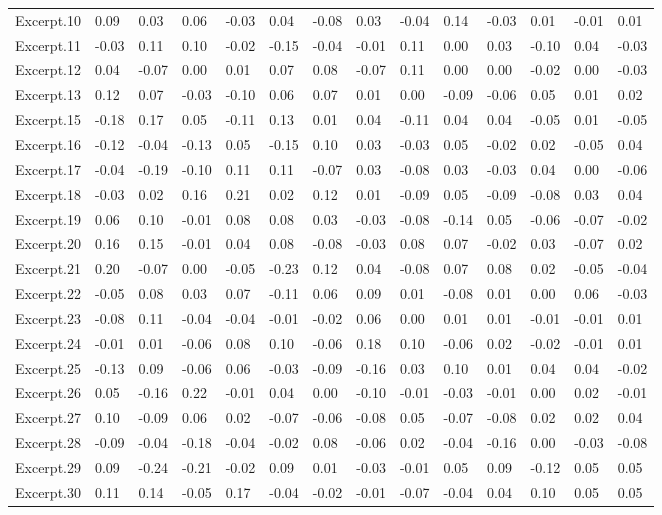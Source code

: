 \documentclass[
]{article}
\newenvironment{lltable}{\begin{landscape}\begin{center}\begin{ThreePartTable}}{\end{ThreePartTable}\end{center}\end{landscape}}
\begin{document}
\begin{lltable}
{\begin{longtable}{llllllllllllll}
Excerpt.10 & 0.09 & 0.03 & 0.06 & -0.03 & 0.04 & -0.08 & 0.03 & -0.04 & 0.14 & -0.03 & 0.01 & -0.01 & 0.01\\
Excerpt.11 & -0.03 & 0.11 & 0.10 & -0.02 & -0.15 & -0.04 & -0.01 & 0.11 & 0.00 & 0.03 & -0.10 & 0.04 & -0.03\\
Excerpt.12 & 0.04 & -0.07 & 0.00 & 0.01 & 0.07 & 0.08 & -0.07 & 0.11 & 0.00 & 0.00 & -0.02 & 0.00 & -0.03\\
Excerpt.13 & 0.12 & 0.07 & -0.03 & -0.10 & 0.06 & 0.07 & 0.01 & 0.00 & -0.09 & -0.06 & 0.05 & 0.01 & 0.02\\
Excerpt.15 & -0.18 & 0.17 & 0.05 & -0.11 & 0.13 & 0.01 & 0.04 & -0.11 & 0.04 & 0.04 & -0.05 & 0.01 & -0.05\\
Excerpt.16 & -0.12 & -0.04 & -0.13 & 0.05 & -0.15 & 0.10 & 0.03 & -0.03 & 0.05 & -0.02 & 0.02 & -0.05 & 0.04\\
Excerpt.17 & -0.04 & -0.19 & -0.10 & 0.11 & 0.11 & -0.07 & 0.03 & -0.08 & 0.03 & -0.03 & 0.04 & 0.00 & -0.06\\
Excerpt.18 & -0.03 & 0.02 & 0.16 & 0.21 & 0.02 & 0.12 & 0.01 & -0.09 & 0.05 & -0.09 & -0.08 & 0.03 & 0.04\\
Excerpt.19 & 0.06 & 0.10 & -0.01 & 0.08 & 0.08 & 0.03 & -0.03 & -0.08 & -0.14 & 0.05 & -0.06 & -0.07 & -0.02\\
Excerpt.20 & 0.16 & 0.15 & -0.01 & 0.04 & 0.08 & -0.08 & -0.03 & 0.08 & 0.07 & -0.02 & 0.03 & -0.07 & 0.02\\
Excerpt.21 & 0.20 & -0.07 & 0.00 & -0.05 & -0.23 & 0.12 & 0.04 & -0.08 & 0.07 & 0.08 & 0.02 & -0.05 & -0.04\\
Excerpt.22 & -0.05 & 0.08 & 0.03 & 0.07 & -0.11 & 0.06 & 0.09 & 0.01 & -0.08 & 0.01 & 0.00 & 0.06 & -0.03\\
Excerpt.23 & -0.08 & 0.11 & -0.04 & -0.04 & -0.01 & -0.02 & 0.06 & 0.00 & 0.01 & 0.01 & -0.01 & -0.01 & 0.01\\
Excerpt.24 & -0.01 & 0.01 & -0.06 & 0.08 & 0.10 & -0.06 & 0.18 & 0.10 & -0.06 & 0.02 & -0.02 & -0.01 & 0.01\\
Excerpt.25 & -0.13 & 0.09 & -0.06 & 0.06 & -0.03 & -0.09 & -0.16 & 0.03 & 0.10 & 0.01 & 0.04 & 0.04 & -0.02\\
Excerpt.26 & 0.05 & -0.16 & 0.22 & -0.01 & 0.04 & 0.00 & -0.10 & -0.01 & -0.03 & -0.01 & 0.00 & 0.02 & -0.01\\
Excerpt.27 & 0.10 & -0.09 & 0.06 & 0.02 & -0.07 & -0.06 & -0.08 & 0.05 & -0.07 & -0.08 & 0.02 & 0.02 & 0.04\\
Excerpt.28 & -0.09 & -0.04 & -0.18 & -0.04 & -0.02 & 0.08 & -0.06 & 0.02 & -0.04 & -0.16 & 0.00 & -0.03 & -0.08\\
Excerpt.29 & 0.09 & -0.24 & -0.21 & -0.02 & 0.09 & 0.01 & -0.03 & -0.01 & 0.05 & 0.09 & -0.12 & 0.05 & 0.05\\
Excerpt.30 & 0.11 & 0.14 & -0.05 & 0.17 & -0.04 & -0.02 & -0.01 & -0.07 & -0.04 & 0.04 & 0.10 & 0.05 & 0.05\\
\bottomrule
\end{longtable}

}

\end{lltable}
\end{document}
